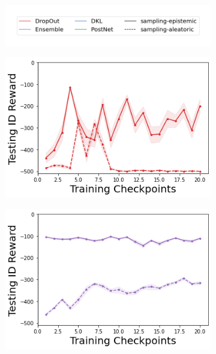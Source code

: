 \begin{figure}
    \centering
    \begin{subfigure}{.45\textwidth}
        \includegraphics[width=\textwidth]{sections/011_icml2022/resources/sampling-legend.png}
    \end{subfigure}
    \vspace{-3mm}
    
    \begin{subfigure}{.245\textwidth}
        \includegraphics[width=\textwidth]{sections/011_icml2022/resources/DropOut-Acrobot-v1-mean_reward_-testing-strategy.png}
    \end{subfigure}
    \begin{subfigure}{.245\textwidth}
        \includegraphics[width=\textwidth]{sections/011_icml2022/resources/Ensemble-Acrobot-v1-mean_reward_-testing-strategy.png}

\end{subfigure}
\end{figure}
